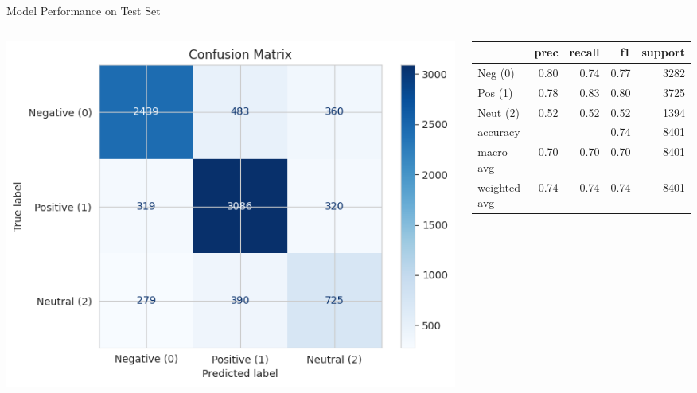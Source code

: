 \documentclass[aspectratio=169]{beamer}
\begin{document}
\begin{frame}{Model Performance on Test Set}
  \begin{columns}
    \begin{column}{0.5\textwidth}
      \centering
      \includegraphics[width=1.0\linewidth]{confusion_matrix.png}
    \end{column}
    \begin{column}{0.35\textwidth}
      \centering
      \scriptsize
      \begin{tabular}{@{}lrrrr@{}}
        \toprule
        & \textbf{prec} & \textbf{recall} & \textbf{f1} & \textbf{support} \\
        \midrule
        Neg (0) & 0.80 & 0.74 & 0.77 & 3282 \\
        Pos (1) & 0.78 & 0.83 & 0.80 & 3725 \\
        Neut (2) & 0.52 & 0.52 & 0.52 & 1394 \\
        \midrule
        accuracy & & & 0.74 & 8401 \\
        macro avg & 0.70 & 0.70 & 0.70 & 8401 \\
        weighted avg & 0.74 & 0.74 & 0.74 & 8401 \\
        \bottomrule
      \end{tabular}
    \end{column}
  \end{columns}
\end{frame}
\end{document}
